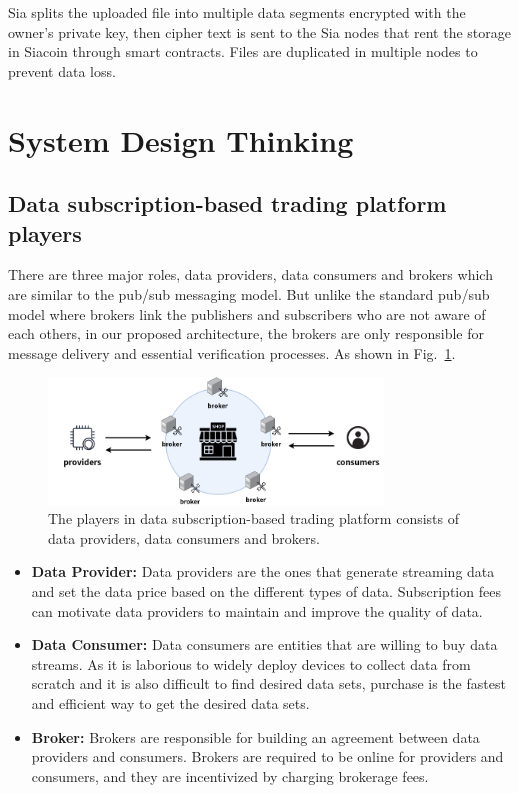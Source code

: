 \documentclass[conference]{IEEEtran}
\begin{document}
Sia\cite{Sia} splits the uploaded file into multiple data segments encrypted with the owner's private key, then cipher text is sent to the Sia nodes that rent the storage in Siacoin through smart contracts. Files are duplicated in multiple nodes to prevent data loss.

\section{System Design Thinking}
\label{section:design_thinking}
\subsection{Data subscription-based trading platform players}
There are three major roles, data providers, data consumers and brokers which are similar to the pub/sub messaging model. But unlike the standard pub/sub model where brokers link the publishers and subscribers who are not aware of each others, in our proposed architecture, the brokers are only responsible for message delivery and essential verification processes. As shown in Fig.~\ref{fig:pub_sub_model}.

\begin{figure}[!t]
    \centering
    \includegraphics[width=3.5in]{pub_sub_model}
    \caption{The players in data subscription-based trading platform consists of data providers, data consumers and brokers.}
    \label{fig:pub_sub_model}
\end{figure}

\begin{itemize}
\item \textbf{Data Provider: }
Data providers are the ones that generate streaming data and set the data price based on the different types of data. Subscription fees can motivate data providers to maintain and improve the quality of data.
\item \textbf{Data Consumer: }
Data consumers are entities that are willing to buy data streams. As it is laborious to widely deploy devices to collect data from scratch and it is also difficult to find desired data sets, purchase is the fastest and efficient way to get the desired data sets.
\item \textbf{Broker: }
Brokers are responsible for building an agreement between data providers and consumers. Brokers are required to be online for providers and consumers, and they are incentivized by charging brokerage fees.
\end{itemize}
\end{document}
